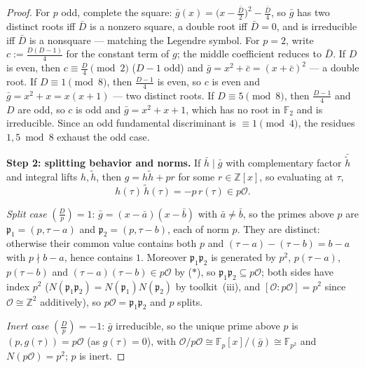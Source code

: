 \begin{proof}
  For $p$ odd, complete the square:
  $\bar{g}(x) = \bigl(x - \tfrac{\bar{D}}{2}\bigr)^2 - \tfrac{\bar{D}}{4}$, so $\bar{g}$
  has two distinct roots iff $\bar{D}$ is a nonzero square, a double root iff
  $\bar{D} = 0$, and is irreducible iff $\bar{D}$ is a nonsquare --- matching the
  Legendre symbol. For $p = 2$, write $c := \tfrac{D(D-1)}{4}$ for the constant term of
  $g$; the middle coefficient reduces to $\bar{D}$. If $D$ is even, then
  $c \equiv \tfrac{D}{4} \pmod 2$ ($D - 1$ odd) and
  $\bar{g} = x^2 + \bar{c} = (x + \bar{c})^2$ --- a double root. If
  $D \equiv 1 \pmod 8$, then $\tfrac{D-1}{4}$ is even, so $c$ is even and
  $\bar{g} = x^2 + x = x(x+1)$ --- two distinct roots. If $D \equiv 5 \pmod 8$, then
  $\tfrac{D-1}{4}$ and $D$ are odd, so $c$ is odd and $\bar{g} = x^2 + x + 1$, which has
  no root in $\mathbb{F}_2$ and is irreducible. Since an odd fundamental discriminant is
  $\equiv 1 \pmod 4$, the residues $1, 5 \bmod 8$ exhaust the odd case.

  \textbf{Step 2: splitting behavior and norms.} If $\bar{h} \mid \bar{g}$ with
  complementary factor $\bar{\tilde{h}}$ and integral lifts $h, \tilde{h}$, then
  $g = h\tilde{h} + pr$ for some $r \in \mathbb{Z}[x]$, so evaluating at $\tau$,
  \[
    h(\tau)\,\tilde{h}(\tau) = -p\,r(\tau) \in p\mathcal{O}. \tag{$*$}
  \]

  \emph{Split case} $\left(\frac{D}{p}\right) = 1$:
  $\bar{g} = (x-\bar{a})(x-\bar{b})$ with $\bar{a} \neq \bar{b}$, so the primes above $p$
  are $\mathfrak{p}_1 = (p, \tau - a)$ and $\mathfrak{p}_2 = (p, \tau - b)$, each of norm
  $p$. They are distinct: otherwise their common value contains both $p$ and
  $(\tau - a) - (\tau - b) = b - a$ with $p \nmid b - a$, hence contains $1$. Moreover
  $\mathfrak{p}_1\mathfrak{p}_2$ is generated by $p^2$, $p(\tau-a)$, $p(\tau-b)$ and
  $(\tau-a)(\tau-b) \in p\mathcal{O}$ by ($*$), so
  $\mathfrak{p}_1\mathfrak{p}_2 \subseteq p\mathcal{O}$; both sides have index $p^2$
  ($N(\mathfrak{p}_1\mathfrak{p}_2) = N(\mathfrak{p}_1)N(\mathfrak{p}_2)$ by
  toolkit~(iii), and $[\mathcal{O} : p\mathcal{O}] = p^2$ since
  $\mathcal{O} \cong \mathbb{Z}^2$ additively), so
  $p\mathcal{O} = \mathfrak{p}_1\mathfrak{p}_2$ and $p$ splits.

  \emph{Inert case} $\left(\frac{D}{p}\right) = -1$: $\bar{g}$ irreducible, so the unique
  prime above $p$ is $(p, g(\tau)) = p\mathcal{O}$ (as $g(\tau) = 0$), with
  $\mathcal{O}/p\mathcal{O} \cong \mathbb{F}_p[x]/(\bar{g}) \cong \mathbb{F}_{p^2}$ and
  $N(p\mathcal{O}) = p^2$; $p$ is inert.


\end{proof}
